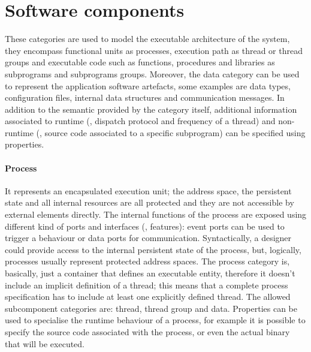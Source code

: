 \section{Software components}
These categories are used to model the executable architecture of the system, they encompass functional units as processes, execution path as thread or thread groups and executable code such as functions, procedures and libraries as subprograms and subprograms groups. Moreover, the data category can be used to represent the application software artefacts, some examples are data types, configuration files, internal data structures and communication messages. In addition to the semantic provided by the category itself, additional information associated to runtime (\eg, dispatch protocol and frequency of a thread) and non-runtime (\eg, source code associated to a specific subprogram) can be specified using properties.

\paragraph{Process} It represents an encapsulated execution unit; the address space, the persistent state and all internal resources are all protected and they are not accessible by external elements directly. The internal functions of the process are exposed using different kind of ports and interfaces (\ie, features): event ports can be used to trigger a behaviour or data ports for communication. Syntactically, a designer could provide access to the internal persistent state of the process, but, logically, processes usually represent protected address spaces. The process category is, basically, just a container that defines an executable entity, therefore it doesn't include an implicit definition of a thread; this means that a complete process specification has to include at least one explicitly defined thread. The allowed subcomponent categories are: thread, thread group and data. Properties can be used to specialise the runtime behaviour of a process, for example it is possible to specify the source code associated with the process, or even the actual binary that will be executed. 

